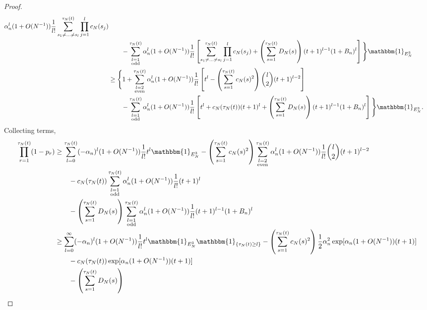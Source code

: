 \documentclass{article}
\newcommand{\I}[1]{\mathbbm{1}_{\{#1\}}}
\newcommand{\1}[1]{\mathbbm{1}_{#1}}
\begin{document}
\begin{proof}
\begin{align}
        \alpha_n^l (1+O(N^{-1})) \frac{1}{l!} 
        \sum_{s_1\neq\dots\neq s_l}^{\tau_N(t)}\prod_{j=1}^l c_N(s_j) \notag\\
    &\qquad- \sum_{\substack{l=1 \\ \text{odd} }}^{\tau_N(t)} 
        \alpha_n^l (1+O(N^{-1})) \frac{1}{l!}
        \left[ \sum_{s_1\neq\dots\neq s_l}^{\tau_N(t)}\prod_{j=1}^l c_N(s_j)
        + \left( \sum_{s=1}^{\tau_N(t)} D_N(s) \right)
        (t+1)^{l-1} (1+B_n)^l \right] \Bigg\} \1{E_N^3} \notag\\
&\geq \Bigg\{ 1 + \sum_{\substack{l=2 \\ \text{even} }}^{\tau_N(t)} 
        \alpha_n^l (1+O(N^{-1})) \frac{1}{l!} 
        \left[ t^l - \left( \sum_{s=1}^{\tau_N(t)} c_N(s)^2 \right)
        \binom{l}{2}(t+1)^{l-2} \right] \notag\\
    &\qquad- \sum_{\substack{l=1 \\ \text{odd} }}^{\tau_N(t)} 
        \alpha_n^l (1+O(N^{-1})) \frac{1}{l!}
        \left[ t^l + c_N(\tau_N(t)) (t+1)^l
        + \left( \sum_{s=1}^{\tau_N(t)} D_N(s) \right)
        (t+1)^{l-1} (1+B_n)^l \right] \Bigg\} \1{E_N^3} .
\end{align}
Collecting terms,
\begin{align}
\prod_{r=1}^{\tau_N(t)} (1-p_r)
&\geq \sum_{l=0}^{\tau_N(t)} (-\alpha_n)^l (1+O(N^{-1})) 
        \frac{1}{l!} t^l \1{E_N^3}
        - \left( \sum_{s=1}^{\tau_N(t)} c_N(s)^2 \right)
        \sum_{\substack{l=2 \\ \text{even} }}^{\tau_N(t)} 
        \alpha_n^l (1+O(N^{-1})) \frac{1}{l!} \binom{l}{2}(t+1)^{l-2} \notag\\
    &\qquad- c_N(\tau_N(t)) \sum_{\substack{l=1 \\ \text{odd} }}^{\tau_N(t)} 
        \alpha_n^l (1+O(N^{-1})) \frac{1}{l!} (t+1)^l \notag\\
    &\qquad- \left( \sum_{s=1}^{\tau_N(t)} D_N(s) \right)
        \sum_{\substack{l=1 \\ \text{odd} }}^{\tau_N(t)} 
        \alpha_n^l (1+O(N^{-1})) \frac{1}{l!} (t+1)^{l-1} (1+B_n)^l \notag\\
&\geq \sum_{l=0}^{\infty} (-\alpha_n)^l (1+O(N^{-1})) 
        \frac{1}{l!} t^l \1{E_N^3} \I{ \tau_N(t) \geq l}
        - \left( \sum_{s=1}^{\tau_N(t)} c_N(s)^2 \right)
        \frac{1}{2} \alpha_n^2 \exp[ \alpha_n (1+O(N^{-1})) (t+1) ]\notag\\
    &\qquad- c_N(\tau_N(t)) \exp[ \alpha_n (1+O(N^{-1})) (t+1) ] \notag\\
    &\qquad- \left( \sum_{s=1}^{\tau_N(t)} D_N(s) \right)

\end{align}
\end{proof}
\end{document}
